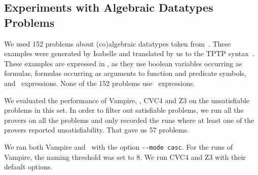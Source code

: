%
%


\subsection{Experiments with Algebraic Datatypes Problems}\label{subsec:ADT}
We used 152 problems about (co)algebraic datatypes taken from~\cite{Blanchette15}. 
These examples were generated by Isabelle and translated by us to the TPTP syntax~\cite{TPTP}. 
These examples are expressed in \folb{}, as they use boolean variables occurring as formulas, formulas occurring as arguments to function and predicate symbols, and \ITE\ expressions. None of the 152 problems use \LETIN\ expressions.

We evaluated the performance of Vampire, \oldcnfVampire,
CVC4 and Z3 on the unsatisfiable problems in this set. In order to filter out satisfiable problems, we run all the provers on all the problems 
and only recorded the runs where at least one of the provers reported unsatisfiability. That gave us 57 problems.

We ran both Vampire and \oldcnfVampire\ with the option \verb'--mode casc'. For the runs of Vampire, the naming threshold was set to 8. We run CVC4 and Z3 with their default options.

